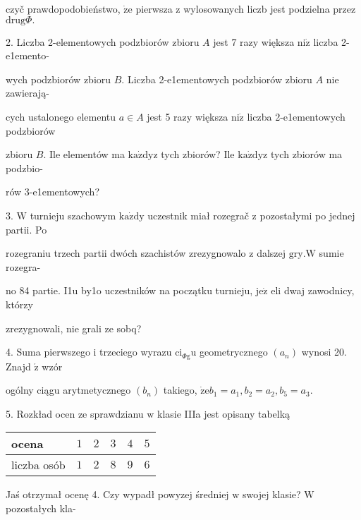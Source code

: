 \documentclass[a4paper,12pt]{article}
\begin{document}
czyč prawdopodobieństwo, $\dot{\mathrm{z}}\mathrm{e}$ pierwsza $\mathrm{z}$ wylosowanych liczb jest podzielna przez $\mathrm{d}\mathrm{r}\mathrm{u}\mathrm{g}\Phi.$

2. Liczba 2-elementowych podzbiorów zbioru $A$ jest 7 razy większa $\mathrm{n}\mathrm{i}\dot{\mathrm{z}}$ liczba 2-e1emento-

wych podzbiorów zbioru $B$. Liczba 2-e1ementowych podzbiorów zbioru $A$ nie zawierają-

cych ustalonego elementu $a\in A$ jest 5 razy większa $\mathrm{n}\mathrm{i}\dot{\mathrm{z}}$ liczba 2-e1ementowych podzbiorów

zbioru $B$. Ile elementów ma $\mathrm{k}\mathrm{a}\dot{\mathrm{z}}\mathrm{d}\mathrm{y}\mathrm{z}$ tych zbiorów? Ile $\mathrm{k}\mathrm{a}\dot{\mathrm{z}}\mathrm{d}\mathrm{y}\mathrm{z}$ tych zbiorów ma podzbio-

rów 3-e1ementowych?

3. $\mathrm{W}$ turnieju szachowym $\mathrm{k}\mathrm{a}\dot{\mathrm{z}}\mathrm{d}\mathrm{y}$ uczestnik miał rozegrač $\mathrm{z}$ pozostałymi po jednej partii. Po

rozegraniu trzech partii dwóch szachistów zrezygnowalo $\mathrm{z}$ dalszej $\mathrm{g}\mathrm{r}\mathrm{y}. \mathrm{W}$ sumie rozegra-

no 84 partie. I1u by1o uczestników na początku turnieju, $\mathrm{j}\mathrm{e}\dot{\mathrm{z}}$ eli dwaj zawodnicy, którzy

zrezygnowali, nie grali ze sobq?

4. Suma pierwszego $\mathrm{i}$ trzeciego wyrazu $\mathrm{c}\mathrm{i}_{\Phi \mathrm{g}}\mathrm{u}$ geometrycznego $(a_{n})$ wynosi 20. Znajd $\acute{\mathrm{z}}$ wzór

ogólny ciągu arytmetycznego $(b_{n})$ takiego, $\dot{\mathrm{z}}\mathrm{e}b_{1}=a_{1}, b_{2}=a_{2}, b_{5}=a_{3}.$

5. Rozkład ocen ze sprawdzianu $\mathrm{w}$ klasie IIIa jest opisany tabelką
\begin{center}
\begin{tabular}{l|l|l|l|l|l}
\multicolumn{1}{l|}{ocena}&	\multicolumn{1}{|l|}{$1$}&	\multicolumn{1}{|l|}{ $2$}&	\multicolumn{1}{|l|}{ $3$}&	\multicolumn{1}{|l|}{ $4$}&	\multicolumn{1}{|l}{ $5$}	\\
\hline
\multicolumn{1}{l|}{liczba osób}&	\multicolumn{1}{|l|}{$1$}&	\multicolumn{1}{|l|}{ $2$}&	\multicolumn{1}{|l|}{ $8$}&	\multicolumn{1}{|l|}{ $9$}&	\multicolumn{1}{|l}{ $6$}
\end{tabular}

\end{center}
Jaś otrzymał ocenę 4. Czy wypadł powyzej średniej $\mathrm{w}$ swojej klasie? $\mathrm{W}$ pozostałych kla-
\end{document}
